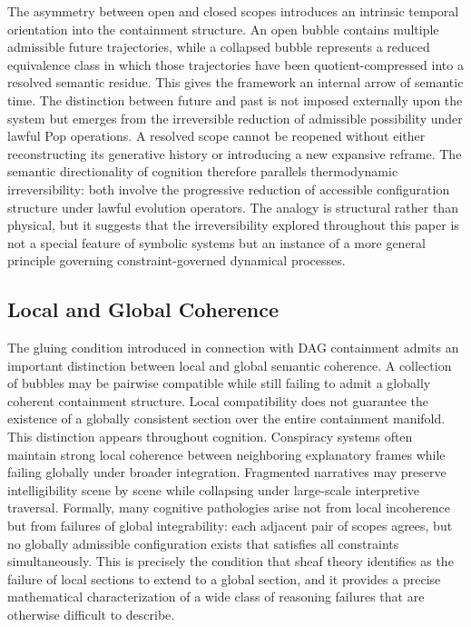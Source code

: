 \documentclass[12pt, a4paper]{article}
\theoremstyle{plain}
\theoremstyle{definition}
\theoremstyle{remark}
\begin{document}
The asymmetry between open and closed scopes introduces an intrinsic temporal
orientation into the containment structure. An open bubble contains multiple
admissible future trajectories, while a collapsed bubble represents a reduced
equivalence class in which those trajectories have been quotient-compressed
into a resolved semantic residue. This gives the framework an internal arrow
of semantic time. The distinction between future and past is not imposed
externally upon the system but emerges from the irreversible reduction of
admissible possibility under lawful Pop operations. A resolved scope cannot be
reopened without either reconstructing its generative history or introducing a
new expansive reframe. The semantic directionality of cognition therefore
parallels thermodynamic irreversibility: both involve the progressive reduction
of accessible configuration structure under lawful evolution operators. The
analogy is structural rather than physical, but it suggests that the
irreversibility explored throughout this paper is not a special feature of
symbolic systems but an instance of a more general principle governing
constraint-governed dynamical processes.

\subsection{Local and Global Coherence}

The gluing condition introduced in connection with DAG containment admits an
important distinction between local and global semantic coherence. A
collection of bubbles may be pairwise compatible while still failing to admit
a globally coherent containment structure. Local compatibility does not
guarantee the existence of a globally consistent section over the entire
containment manifold. This distinction appears throughout cognition. Conspiracy
systems often maintain strong local coherence between neighboring explanatory
frames while failing globally under broader integration. Fragmented narratives
may preserve intelligibility scene by scene while collapsing under large-scale
interpretive traversal. Formally, many cognitive pathologies arise not from
local incoherence but from failures of global integrability: each adjacent
pair of scopes agrees, but no globally admissible configuration exists that
satisfies all constraints simultaneously. This is precisely the condition that
sheaf theory identifies as the failure of local sections to extend to a global
section, and it provides a precise mathematical characterization of a wide
class of reasoning failures that are otherwise difficult to describe.
\end{document}
